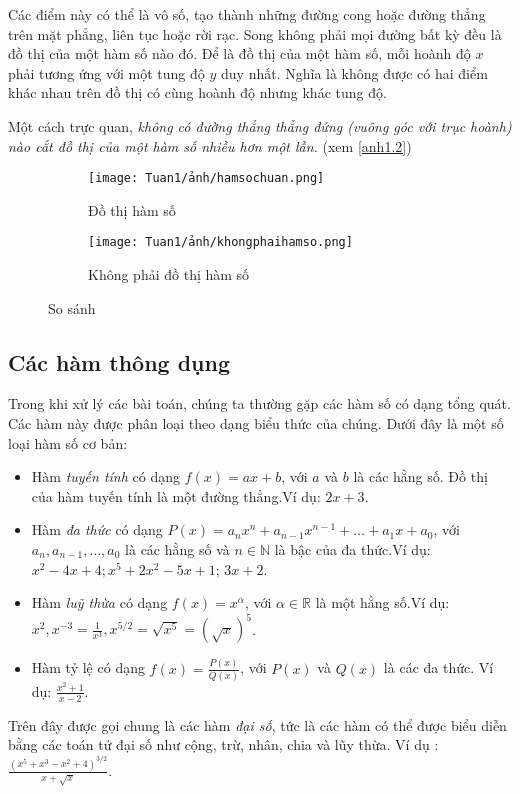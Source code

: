 Các điểm này có thể là vô số, tạo thành những đường cong hoặc đường thẳng trên mặt phẳng, liên tục hoặc rời rạc. Song không phải mọi đường bất kỳ đều là đồ thị của một hàm số nào đó. Để là đồ thị của một hàm số, mỗi hoành độ $x$ phải tương ứng với một tung độ $y$ duy nhất. Nghĩa là không được có hai điểm khác nhau trên đồ thị có cùng hoành độ nhưng khác tung độ.

Một cách trực quan,\emph{ không có đường thẳng thẳng đứng (vuông góc với trục hoành) nào cắt đồ thị của một hàm số nhiều hơn một lần.} (xem \ref{anh1.2})
\begin{figure}[htbp]
    \centering
    \begin{subfigure}{0.4\textwidth}
        \centering
        \texttt{[image: Tuan1/ảnh/hamsochuan.png]}
        \caption{Đồ thị hàm số}
    \end{subfigure}
    \hfill
    \begin{subfigure}{0.4\textwidth}
        \centering
        \texttt{[image: Tuan1/ảnh/khongphaihamso.png]}
        \caption{Không phải đồ thị hàm số}
    \end{subfigure}
    \caption{So sánh}\label{anh1.3}
    \end{figure}

\subsection{Các hàm thông dụng}

Trong khi xử lý các bài toán, chúng ta thường gặp các hàm số có dạng tổng quát. Các hàm này được phân loại theo dạng biểu thức của chúng. Dưới đây là một số loại hàm số cơ bản:   \begin{itemize}
    \item Hàm \emph{tuyến tính} có dạng $f(x) = ax + b$, với $a$ và $b$ là các hằng số. Đồ thị của hàm tuyến tính là một đường thẳng.\newline Ví dụ: $ 2x+3$.
    \item Hàm \emph{đa thức} có dạng $P(x) = a_n x^n + a_{n-1} x^{n-1} + \ldots + a_1 x + a_0$, với $a_n, a_{n-1}, \ldots, a_0$ là các hằng số và $n\in\mathbb{N}$ là bậc của đa thức.\newline Ví dụ: $x^2 - 4x + 4; x^5 + 2x^2 - 5x + 1$; $3x+2$.
    \item Hàm \emph{luỹ thừa} có dạng $f(x)=x^\alpha$, với $\alpha\in\mathbb{R}$ là một hằng số.\newline Ví dụ: $x^2, x^{-3}=\frac{1}{x^3}, x^{5/2}=\sqrt{x^5}=(\sqrt x)^5$.     
    \item Hàm tỷ lệ có dạng $f(x) = \frac{P(x)}{Q(x)}$, với $P(x)$ và $Q(x)$ là các đa thức. Ví dụ: $\frac{x^2+1}{x-2}$.    
\end{itemize}
Trên đây được gọi chung là các hàm \emph{đại số}, tức là các hàm có thể được biểu diễn bằng các toán tử đại số như cộng, trừ, nhân, chia và lũy thừa.\newline
Ví dụ : $\frac{\left(x^5+x^3-x^2+4\right)^{3/2}}{x+\sqrt x}$.
\vspace{8pt}

